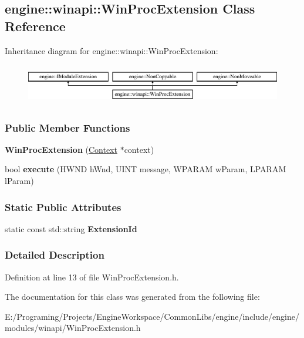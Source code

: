 \hypertarget{a00092}{}\subsection{engine\+:\+:winapi\+:\+:Win\+Proc\+Extension Class Reference}
\label{a00092}
Inheritance diagram for engine\+:\+:winapi\+:\+:Win\+Proc\+Extension\+:\begin{figure}[H]
\begin{center}
\leavevmode
\includegraphics[height=1.794872cm]{a00092}
\end{center}
\end{figure}
\subsubsection*{Public Member Functions}
\begin{DoxyCompactItemize}
\item 
{\bfseries Win\+Proc\+Extension} (\hyperlink{a00012}{Context} $\ast$context)\hypertarget{a00092_a4c6d797b794492fb8e4f4c13248d7281}{}\label{a00092_a4c6d797b794492fb8e4f4c13248d7281}

\item 
bool {\bfseries execute} (H\+W\+ND h\+Wnd, U\+I\+NT message, W\+P\+A\+R\+AM w\+Param, L\+P\+A\+R\+AM l\+Param)\hypertarget{a00092_a63fe58c5db6977bdd6cc4ef425f45ac1}{}\label{a00092_a63fe58c5db6977bdd6cc4ef425f45ac1}

\end{DoxyCompactItemize}
\subsubsection*{Static Public Attributes}
\begin{DoxyCompactItemize}
\item 
static const std\+::string {\bfseries Extension\+Id}\hypertarget{a00092_af3b1f227600b6b1b640f957b657a431d}{}\label{a00092_af3b1f227600b6b1b640f957b657a431d}

\end{DoxyCompactItemize}


\subsubsection{Detailed Description}


Definition at line 13 of file Win\+Proc\+Extension.\+h.



The documentation for this class was generated from the following file\+:\begin{DoxyCompactItemize}
\item 
E\+:/\+Programing/\+Projects/\+Engine\+Workspace/\+Common\+Libs/engine/include/engine/modules/winapi/Win\+Proc\+Extension.\+h\end{DoxyCompactItemize}
